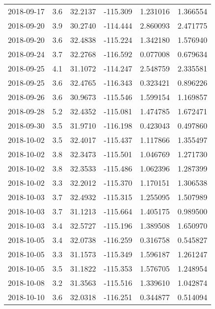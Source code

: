 \begin{tabular}{lrrrrr}
2018-09-17 &       3.6 &  32.2137 &  -115.309 &         1.231016 &         1.366554 \\
2018-09-20 &       3.9 &  30.2740 &  -114.444 &         2.860093 &         2.471775 \\
2018-09-20 &       3.6 &  32.4838 &  -115.224 &         1.342180 &         1.576940 \\
2018-09-24 &       3.7 &  32.2768 &  -116.592 &         0.077008 &         0.679634 \\
2018-09-25 &       4.1 &  31.1072 &  -114.247 &         2.548759 &         2.335581 \\
2018-09-25 &       3.6 &  32.4765 &  -116.343 &         0.323421 &         0.896226 \\
2018-09-26 &       3.6 &  30.9673 &  -115.546 &         1.599154 &         1.169857 \\
2018-09-28 &       5.2 &  32.4352 &  -115.081 &         1.474785 &         1.672471 \\
2018-09-30 &       3.5 &  31.9710 &  -116.198 &         0.423043 &         0.497860 \\
2018-10-02 &       3.5 &  32.4017 &  -115.437 &         1.117866 &         1.355497 \\
2018-10-02 &       3.8 &  32.3473 &  -115.501 &         1.046769 &         1.271730 \\
2018-10-02 &       3.8 &  32.3533 &  -115.486 &         1.062396 &         1.287399 \\
2018-10-02 &       3.3 &  32.2012 &  -115.370 &         1.170151 &         1.306538 \\
2018-10-03 &       3.7 &  32.4932 &  -115.315 &         1.255095 &         1.507989 \\
2018-10-03 &       3.7 &  31.1213 &  -115.664 &         1.405175 &         0.989500 \\
2018-10-03 &       3.4 &  32.5727 &  -115.196 &         1.389508 &         1.650970 \\
2018-10-05 &       3.4 &  32.0738 &  -116.259 &         0.316758 &         0.545827 \\
2018-10-05 &       3.3 &  31.1573 &  -115.349 &         1.596187 &         1.261247 \\
2018-10-05 &       3.5 &  31.1822 &  -115.353 &         1.576705 &         1.248954 \\
2018-10-08 &       3.2 &  31.3563 &  -115.516 &         1.339610 &         1.042874 \\
2018-10-10 &       3.6 &  32.0318 &  -116.251 &         0.344877 &         0.514094 \\

\end{tabular}
